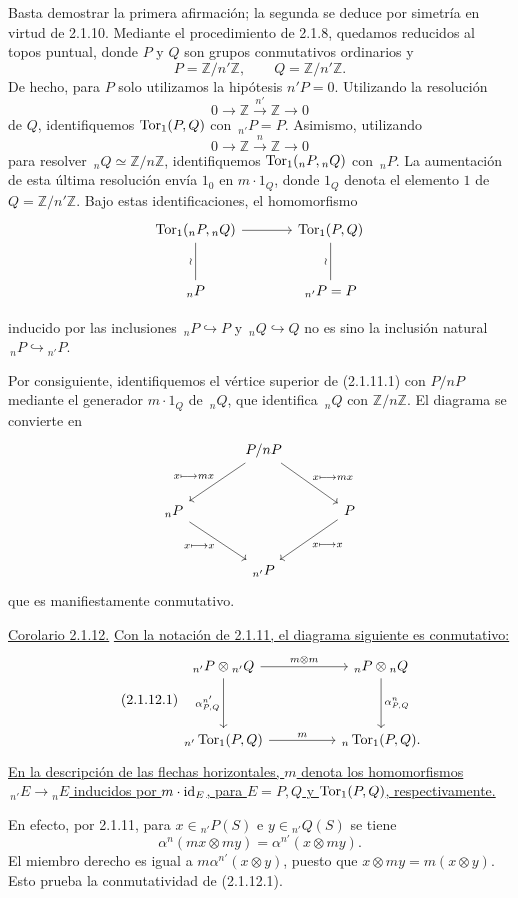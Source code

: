 \medskip
Basta demostrar la primera afirmación; la segunda se deduce por
simetría en virtud de 2.1.10. Mediante el procedimiento de 2.1.8,
quedamos reducidos al topos puntual, donde $P$ y $Q$ son grupos
conmutativos ordinarios y
\[
 P=\mathbb Z/n'\mathbb Z,\qquad Q=\mathbb Z/n'\mathbb Z.
\]
De hecho, para $P$ solo utilizamos la hipótesis $n'P=0$. Utilizando la
resolución
\[
 0\longrightarrow\mathbb Z\xrightarrow{n'}\mathbb Z
 \longrightarrow0
\]
de $Q$, identifiquemos $\operatorname{Tor}_1(P,Q)$ con $\,{}_{n'}P=P$. Asimismo,
utilizando
\[
 0\longrightarrow\mathbb Z\xrightarrow n\mathbb Z
 \longrightarrow0
\]
para resolver $\,{}_nQ\simeq\mathbb Z/n\mathbb Z$, identifiquemos
$\operatorname{Tor}_1({}_nP,{}_nQ)$ con $\,{}_nP$. La aumentación de esta última
resolución envía $1_0$ en $m\cdot1_Q$, donde $1_Q$ denota el elemento
$1$ de $Q=\mathbb Z/n'\mathbb Z$. Bajo estas identificaciones, el
homomorfismo
\[
\begin{tikzcd}[column sep=large,row sep=large]
 \Tor_1({}_nP,{}_nQ)\arrow[r]\arrow[d,no head,"\wr"']&
 \Tor_1(P,Q)\arrow[d,no head,"\wr"']\\
 {}_nP&{}_{n'}P=P
\end{tikzcd}
\]


inducido por las inclusiones $\,{}_nP\hookrightarrow P$ y
$\,{}_nQ\hookrightarrow Q$ no es sino la inclusión natural
$\,{}_nP\hookrightarrow{}_{n'}P$.

Por consiguiente, identifiquemos el vértice superior de (2.1.11.1)
con $P/nP$ mediante el generador $m\cdot1_Q$ de $\,{}_nQ$, que
identifica $\,{}_nQ$ con $\mathbb Z/n\mathbb Z$. El diagrama se
convierte en
\[
\begin{tikzcd}[column sep=large,row sep=large]
 &P/nP
   \arrow[ld,"x\longmapsto mx"']
   \arrow[rd,"x\longmapsto mx"]&\\
 {}_nP\arrow[rd,"x\longmapsto x"']&&
 P\arrow[ld,"x\longmapsto x"]\\
 &{}_{n'}P&
\end{tikzcd}
\]
que es manifiestamente conmutativo.

\medskip
\noindent\underline{Corolario 2.1.12.}
\underline{Con la notación de 2.1.11, el diagrama siguiente es
conmutativo:}
\begin{equation}\tag{2.1.12.1}
\begin{tikzcd}[column sep=huge,row sep=huge]
 {}_{n'}P\otimes{}_{n'}Q
   \arrow[r,"m\otimes m"]
   \arrow[d,"{\alpha^{n'}_{P,Q}}"']&
 {}_nP\otimes{}_nQ
   \arrow[d,"{\alpha^n_{P,Q}}"]\\
 {}_{n'}\uTor_1(P,Q)
   \arrow[r,"m"]&
 {}_n\uTor_1(P,Q).
\end{tikzcd}
\end{equation}
\underline{En la descripción de las flechas horizontales, $m$ denota
los homomorfismos $\,{}_{n'}E\longrightarrow{}_nE$ inducidos por
$m\cdot\mathrm{id}_E$, para $E=P,Q$ y $\operatorname{Tor}_1(P,Q)$, respectivamente.}

\medskip
En efecto, por 2.1.11, para $x\in{}_{n'}P(S)$ e
$y\in{}_{n'}Q(S)$ se tiene
\[
 \alpha^n(mx\otimes my)=\alpha^{n'}(x\otimes my).
\]
El miembro derecho es igual a $m\alpha^{n'}(x\otimes y)$, puesto que
$x\otimes my=m(x\otimes y)$. Esto prueba la conmutatividad de
(2.1.12.1).

